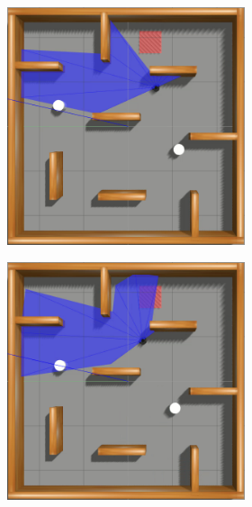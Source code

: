 \begin{figure}[H]
\begin{center}
\begin{subfigure}[b]{0.60\textwidth}
        \begin{subfigure}[b]{0.24\textwidth}
            \includegraphics[width=\textwidth]{imagens/simulated_envs/sim_env3_ddpg/5.png}
        \end{subfigure}
        \hfill
        \begin{subfigure}[b]{0.24\textwidth}
            \includegraphics[width=\textwidth]{imagens/simulated_envs/sim_env3_ddpg/6.png}

\end{subfigure}
\end{subfigure}
\end{center}
\end{figure}
